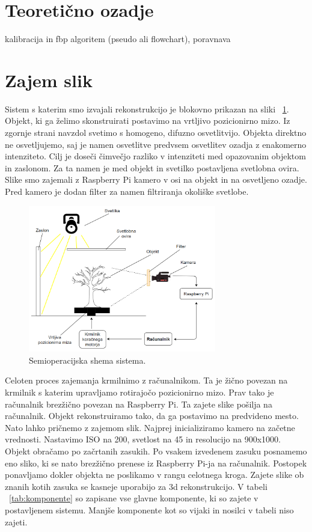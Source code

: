 \documentclass[journal,a4paper,twoside]{sty/IEEEtran}
\begin{document}
\section{Teoretično ozadje}
kalibracija in fbp algoritem (pseudo ali flowchart), poravnava

\section{Zajem slik}
Sistem s katerim smo izvajali rekonstrukcijo je blokovno prikazan na sliki ~\ref{fig:blokovna}. Objekt, ki ga želimo skonstruirati postavimo na vrtljivo pozicionirno mizo. Iz zgornje strani navzdol svetimo s homogeno, difuzno osvetlitvijo. Objekta direktno ne osvetljujemo, saj je namen osvetlitve predvsem osvetlitev ozadja z enakomerno intenziteto. Cilj je doseči čimvečjo razliko v intenziteti med opazovanim objektom in zaslonom. Za ta namen je med objekt in svetilko postavljena svetlobna ovira. Slike smo zajemali z Raspberry Pi kamero v osi na objekt in na osvetljeno ozadje. Pred kamero je dodan filter za namen filtriranja okoliške svetlobe.

\begin{figure}[H]
	\centerline{\includegraphics[width=8.2cm]{fig/blokovna_sistem}}
	\caption{Semioperacijska shema sistema.}
	\label{fig:blokovna}
\end{figure}
%
 Celoten proces zajemanja krmilnimo z računalnikom. Ta je žično povezan na krmilnik s katerim upravljamo rotirajočo pozicionirno mizo. Prav tako je računalnik brezžično povezan na Raspberry Pi. Ta zajete slike pošilja na računalnik. Objekt rekonstruiramo tako, da ga postavimo na predvideno mesto. Nato lahko pričnemo z zajemom slik. Najprej inicializiramo kamero na začetne vrednosti. Nastavimo ISO na 200, svetlost na 45 in resolucijo na 900x1000.  Objekt obračamo po začrtanih zasukih. Po vsakem izvedenem zasuku posnamemo eno sliko, ki se nato brezžično prenese iz Raspberry Pi-ja na računalnik. Postopek ponavljamo dokler objekta ne poslikamo v rangu celotnega kroga. Zajete slike ob znanih kotih zasuka se kasneje uporabijo za 3d rekonstrukcijo. V tabeli ~\ref{tab:komponente} so zapisane vse glavne komponente, ki so zajete v postavljenem sistemu. Manjše komponente kot so vijaki in nosilci v tabeli niso zajeti.
\end{document}
